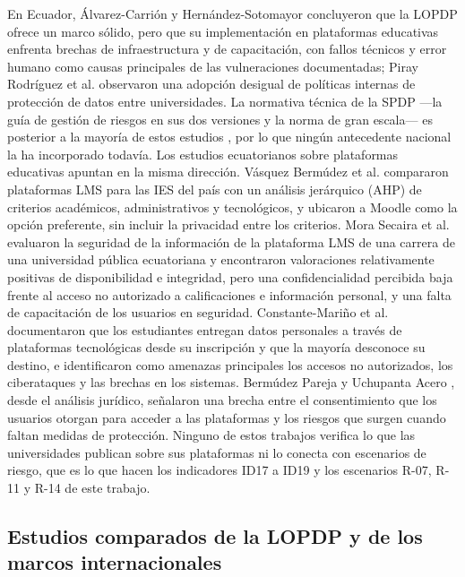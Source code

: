 En Ecuador, Álvarez-Carrión y Hernández-Sotomayor \cite{alvarez2024proteccion} concluyeron que la LOPDP ofrece un marco sólido, pero que su implementación en plataformas educativas enfrenta brechas de infraestructura y de capacitación, con fallos técnicos y error humano como causas principales de las vulneraciones documentadas; Piray Rodríguez et al. \cite{piray2026garantias} observaron una adopción desigual de políticas internas de protección de datos entre universidades. La normativa técnica de la SPDP ---la guía de gestión de riesgos en sus dos versiones y la norma de gran escala--- es posterior a la mayoría de estos estudios \cite{spdp2025guia,spdp2026guiav2,spdp2026granescala}, por lo que ningún antecedente nacional la ha incorporado todavía. Los estudios ecuatorianos sobre plataformas educativas apuntan en la misma dirección. Vásquez Bermúdez et al. \cite{vasquez2024ahp} compararon plataformas LMS para las IES del país con un análisis jerárquico (AHP) de criterios académicos, administrativos y tecnológicos, y ubicaron a Moodle como la opción preferente, sin incluir la privacidad entre los criterios. Mora Secaira et al. \cite{mora2024lms} evaluaron la seguridad de la información de la plataforma LMS de una carrera de una universidad pública ecuatoriana y encontraron valoraciones relativamente positivas de disponibilidad e integridad, pero una confidencialidad percibida baja frente al acceso no autorizado a calificaciones e información personal, y una falta de capacitación de los usuarios en seguridad. Constante-Mariño et al. \cite{constante2025uniandes} documentaron que los estudiantes entregan datos personales a través de plataformas tecnológicas desde su inscripción y que la mayoría desconoce su destino, e identificaron como amenazas principales los accesos no autorizados, los ciberataques y las brechas en los sistemas. Bermúdez Pareja y Uchupanta Acero \cite{bermudez2026proteccion}, desde el análisis jurídico, señalaron una brecha entre el consentimiento que los usuarios otorgan para acceder a las plataformas y los riesgos que surgen cuando faltan medidas de protección. Ninguno de estos trabajos verifica lo que las universidades publican sobre sus plataformas ni lo conecta con escenarios de riesgo, que es lo que hacen los indicadores ID17 a ID19 y los escenarios R-07, R-11 y R-14 de este trabajo.


\subsection{Estudios comparados de la LOPDP y de los marcos internacionales}

